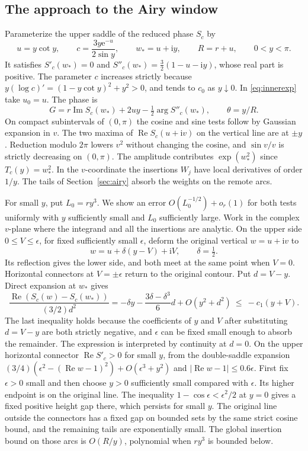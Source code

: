 \documentclass[11pt]{article}
\DeclareMathOperator{\Rea}{Re}
\DeclareMathOperator{\Ima}{Im}
\newcommand{\ee}{\mathrm e}
\newcommand{\ii}{\mathrm i}
\begin{document}
\subsection{The approach to the Airy window}\label{sec:coalescing}
Parameterize the upper saddle of the reduced phase \(S_c\) by
\[
 u=y\cot y,\qquad c=\frac{3y\ee^{-u}}{2\sin y},\qquad
 w_*=u+\ii y,\qquad R=r+u,\qquad 0<y<\pi.
\]
It satisfies \(S'_c(w_*)=0\) and \(S''_c(w_*)=\tfrac32(1-u-\ii y)\), whose real part is positive. The parameter \(c\) increases strictly because
\(y(\log c)'=(1-y\cot y)^2+y^2>0\), and tends to \(c_0\) as \(y\downarrow0\). In \eqref{eq:innerexp} take \(u_0=u\). The phase is
\begin{equation}
 G=r\Ima S_c(w_*)+2uy-\tfrac12\arg S''_c(w_*),
 \qquad \theta=y/R .
 \label{eq:innerphase}
\end{equation}
On compact subintervals of \((0,\pi)\) the cosine and sine tests follow by Gaussian expansion in \(v\). The two maxima of \(\Rea S_c(u+\ii v)\) on the vertical line are at \(\pm y\). Reduction modulo \(2\pi\) lowers \(v^2\) without changing the cosine, and \(\sin v/v\) is strictly decreasing on \((0,\pi)\). The amplitude contributes \(\exp(w_*^2)\) since \(T_c(y)=w_*^2\). In the \(v\)-coordinate the insertions \(W_j\) have local derivatives of order \(1/y\). The tails of Section~\ref{sec:airy} absorb the weights on the remote arcs.

For small \(y\), put \(L_0=r y^3\). We show an error \(O(L_0^{-1/2})+o_r(1)\) for both tests uniformly with \(y\) sufficiently small and \(L_0\) sufficiently large. Work in the complex \(v\)-plane where the integrand and all the insertions are analytic. On the upper side \(0\le V\le\epsilon\), for fixed sufficiently small \(\epsilon\), deform the original vertical \(w=u+\ii v\) to
\[
 w=u+\delta(y-V)+\ii V,\qquad \delta=\tfrac12 .
\]
Its reflection gives the lower side, and both meet at the same point when \(V=0\). Horizontal connectors at \(V=\pm\epsilon\) return to the original contour. Put \(d=V-y\). Direct expansion at \(w_*\) gives
\begin{equation}
 \frac{\Rea(S_c(w)-S_c(w_*))}{(3/2)d^2}
   =-\delta y-\frac{3\delta-\delta^3}{6}d+O(y^2+d^2)
   \ \le\ -c_1(y+V).
 \label{eq:tilt}
\end{equation}
The last inequality holds because the coefficients of \(y\) and \(V\) after substituting \(d=V-y\) are both strictly negative, and \(\epsilon\) can be fixed small enough to absorb the remainder. The expression is interpreted by continuity at \(d=0\). On the upper horizontal connector \(\Rea S'_c>0\) for small \(y\), from the double-saddle expansion \((3/4)(\epsilon^2-(\Rea w-1)^2)+O(\epsilon^3+y^2)\) and \(|\Rea w-1|\le0.6\epsilon\). First fix \(\epsilon>0\) small and then choose \(y>0\) sufficiently small compared with \(\epsilon\). Its higher endpoint is on the original line. The inequality \(1-\cos\epsilon<\epsilon^2/2\) at \(y=0\) gives a fixed positive height gap there, which persists for small \(y\). The original line outside the connectors has a fixed gap on bounded sets by the same strict cosine bound, and the remaining tails are exponentially small. The global insertion bound on those arcs is \(O(R/y)\), polynomial when \(r y^3\) is bounded below.
\end{document}
